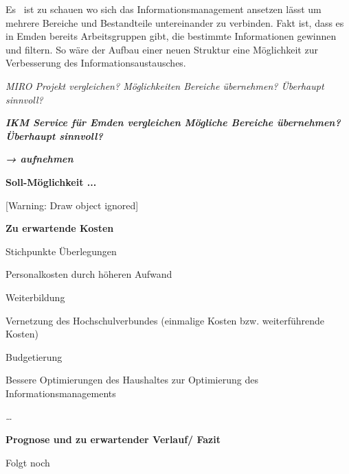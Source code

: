 \documentclass[a4paper]{article}
\newcommand\textstyleFootnoteSymbol[1]{#1}
\newcommand\textstyleAbsatzStandardschriftart[1]{#1}
\begin{document}
{\sffamily
\newline
Es \ ist zu schauen wo sich das Informationsmanagement ansetzen lässt um mehrere Bereiche und Bestandteile untereinander
zu verbinden. Fakt ist, dass es in Emden bereits Arbeitsgruppen gibt, die bestimmte Informationen gewinnen und filtern.
So wäre der Aufbau einer neuen Struktur eine Möglichkeit zur Verbesserung des Informationsaustausches.}


\bigskip


\bigskip

{\sffamily\itshape\color[rgb]{0.8509804,0.8509804,0.8509804}
MIRO Projekt vergleichen?\newline
Möglichkeiten Bereiche übernehmen?\newline
Überhaupt sinnvoll?}

{\itshape\color[rgb]{0.8509804,0.8509804,0.8509804}
\textstyleFootnoteSymbol{\textsf{\textbf{IKM Service für Emden vergleichen \newline
Mögliche Bereiche übernehmen?\newline
Überhaupt sinnvoll?}}}}

{\itshape\color[rgb]{0.8509804,0.8509804,0.8509804}
\textstyleFootnoteSymbol{\textsf{\textbf{→ aufnehmen }}}}

\clearpage
\bigskip

{\sffamily\bfseries
Soll-Möglichkeit ...}

[Warning: Draw object ignored]


\bigskip


\bigskip


\bigskip

\clearpage
\bigskip

{\sffamily\bfseries
Zu erwartende Kosten}


\bigskip

{\sffamily
Stichpunkte Überlegungen}

{\sffamily
Personalkosten durch höheren Aufwand}

{\sffamily
Weiterbildung}

{\sffamily
Vernetzung des Hochschulverbundes (einmalige Kosten bzw. weiterführende Kosten)}

{\sffamily
Budgetierung}

{\sffamily
Bessere Optimierungen des Haushaltes zur Optimierung des Informationsmanagements}

{\itshape\color[rgb]{0.8509804,0.8509804,0.8509804}
\textstyleAbsatzStandardschriftart{\textsf{…}}}

\clearpage
\bigskip

\textstyleAbsatzStandardschriftart{\textsf{\textbf{Prognose und zu erwartender Verlauf/ Fazit}}}


\bigskip

{\sffamily
Folgt noch}


\bigskip
\end{document}
